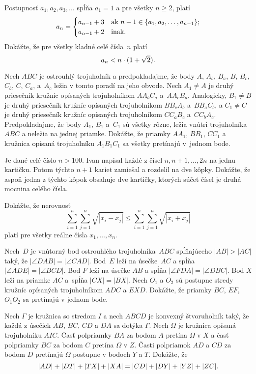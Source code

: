 {%
Postupnosť $a_1, a_2, a_3, \dots$ spĺňa $a_1 = 1$ a pre všetky $n \ge 2$, platí
$$
a_n = \begin{cases}
			a_{n-1} + 3 &
			    \text{ak } n-1 \in \{a_1, a_2,\ldots ,a_{n-1}\};\cr
			a_{n-1} + 2 &
			    \text{inak.}
	  \end{cases}
$$
Dokážte, že pre všetky kladné celé čísla~$n$ platí
$$
a_n < n\cdot(1 + \sqrt2).
\belowdisplayskip0pt
$$
}

{%
Nech $ABC$ je ostrouhlý trojuholník a predpokladajme, že body $A$, $A_b$, $B_a$, $B$, $B_c$, $C_b$, $C$, $C_a$, a~$A_c$ ležia v tomto poradí na jeho obvode. Nech $A_1\ne A$ je druhý priesečník kružníc opísaných trojuholníkom $AA_bC_a$ a~$AA_cB_a$. Analogicky, $B_1\ne B$ je druhý priesečník kružníc opísaných trojuholníkom $BB_cA_b$ a~$BB_aC_b$, a $C_1\ne C$ je druhý priesečník kružníc opísaných trojuholníkom $CC_aB_c$ a~$CC_bA_c$.
Predpokladajme, že body $A_1$, $B_1$ a~$C_1$ sú všetky rôzne, ležia vnútri trojuholníka $ABC$ a neležia na jednej priamke.
Dokážte, že priamky $AA_1$, $BB_1$, $CC_1$ a kružnica opísaná trojuholníku $A_1B_1C_1$ sa všetky pretínajú v~jednom bode.
}

{%
Je dané celé číslo $n>100$. Ivan napísal každé z čísel $n,n+1,\ldots,2n$ na jednu kartičku.
Potom týchto $n+ 1$ kariet zamiešal a rozdelil na dve kôpky. Dokážte, že aspoň jedna z týchto kôpok
obsahuje dve kartičky, ktorých súčet čísel je druhá mocnina celého čísla.}

{%
Dokážte, že nerovnosť
$$
\sum_{i=1}^n \sum_{j=1}^n \sqrt{|x_i-x_j|} \leq
\sum_{i=1}^n \sum_{j=1}^n \sqrt{|x_i+x_j|}
$$
platí pre všetky reálne čísla $x_1,\ldots,x_n$.}

{%
Nech~$D$ je vnútorný bod ostrouhlého trojuholníka~$ABC$ spĺňajúceho $|AB|>|AC|$ taký, že
$|\angle DAB|= |\angle CAD|$. Bod~$E$ leží na úsečke~$AC$ a spĺňa $|\angle ADE|= |\angle BCD|$. Bod $F$ leží na úsečke $AB$
a spĺňa $|\angle FDA|= |\angle DBC|$. Bod $X$ leží na priamke $AC$ a~spĺňa $|CX|= |BX|$. Nech $O_1$ a $O_2$ sú
postupne stredy kružníc opísaných trojuholníkom $ADC$ a $EXD$. Dokážte, že priamky $BC$, $EF$, $O_1O_2$
sa pretínajú v jednom bode.}

{%
Nech $\Gamma$ je kružnica so stredom $I$ a nech $ABCD$ je konvexný štvoruholník taký, že každá
z úsečiek $AB$, $BC$, $CD$ a $DA$ sa dotýka $\Gamma$. Nech $\Omega$ je kružnica opísaná trojuholníku $AIC$. Časť
polpriamky $BA$ za bodom $A$ pretína $\Omega$ v $X$ a časť polpriamky $BC$ za bodom $C$ pretína $\Omega$ v $Z$. Časti
polpriamok $AD$ a $CD$ za bodom $D$ pretínajú $\Omega$ postupne v bodoch $Y$ a $T$. Dokážte, že
$$
|AD|+ |DT |+ |T X|+ |XA|= |CD|+ |DY |+ |Y Z|+ |ZC|.
\belowdisplayskip0pt
$$}


